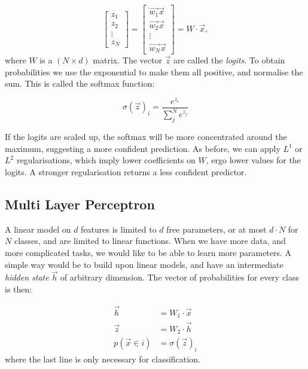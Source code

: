 \begin{equation*}
\begin{bmatrix}z_1 \\ z_2 \\ \vdots \\ z_N\end{bmatrix} = 
\begin{bmatrix}
\vec{w_1} \vec{x} \\ \vec{w_2} \vec{x} \\ \vdots \\ \vec{w_N} \vec{x}
\end{bmatrix} = 
W \cdot \vec{x},
\end{equation*}
where $W$ is a $(N \times d)$ matrix.
The vector $\vec{z}$ are called the \emph{logits}. 
To obtain probabilities we use the exponential to make them all positive, and normalise the sum.
This is called the softmax function:

\begin{equation*}
\sigma(\vec{z})_i = \frac{e^{z_i}}{\sum_j^N e^{z_j}}
\end{equation*}

If the logits are scaled up, the softmax will be more concentrated around the maximum, suggesting a more confident prediction.
As before, we can apply $L^1$ or $L^2$ regularisations, which imply lower coefficients on $W$, ergo lower values for the logits.
A stronger regularisation returns a less confident predictor.

\begin{center}
\end{center}


\subsection{Multi Layer Perceptron}\label{sec:mlp}
A linear model on $d$ features is limited to $d$ free parameters, or at most $d \cdot N$ for $N$ classes, and are limited to linear functions.
When we have more data, and more complicated tasks, we would like to be able to learn more parameters.
A simple way would be to build upon linear models, and have an intermediate \emph{hidden state} $\vec{h}$ of arbitrary dimension.
The vector of probabilities for every class is then:

\begin{align*}
\vec{h} &= W_1 \cdot \vec{x} \\
\vec{z} &= W_2 \cdot \vec{h} \\
p(\vec x \in i) &= \sigma(\vec z)_i
\end{align*}
where the last line is only necessary for classification.

